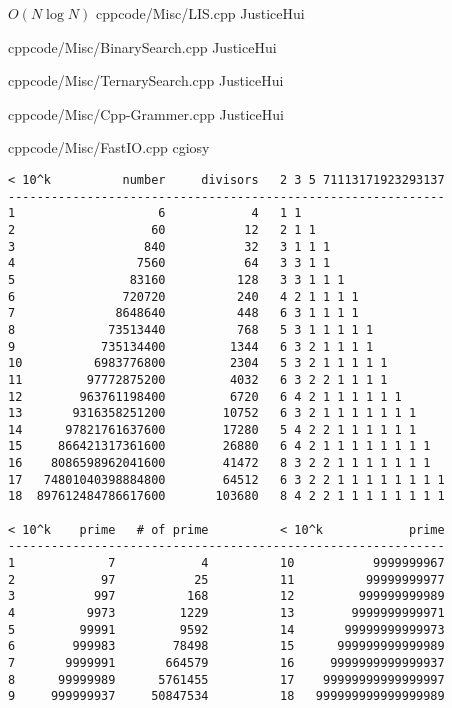\documentclass[landscape, 8pt, a4paper, twocolumn]{extarticle} %
\begin{document}
{}{$O(N \log N)$}
{cpp}{code/Misc/LIS.cpp}
{JusticeHui}

{}{}
{cpp}{code/Misc/BinarySearch.cpp}
{JusticeHui}

{}{}
{cpp}{code/Misc/TernarySearch.cpp}
{JusticeHui}

{}{}
{cpp}{code/Misc/Cpp-Grammer.cpp}
{JusticeHui}

{}{}
{cpp}{code/Misc/FastIO.cpp}
{cgiosy}

\begin{verbatim}
< 10^k          number     divisors   2 3 5 71113171923293137
-------------------------------------------------------------
1                    6            4   1 1
2                   60           12   2 1 1
3                  840           32   3 1 1 1
4                 7560           64   3 3 1 1
5                83160          128   3 3 1 1 1
6               720720          240   4 2 1 1 1 1
7              8648640          448   6 3 1 1 1 1
8             73513440          768   5 3 1 1 1 1 1
9            735134400         1344   6 3 2 1 1 1 1
10          6983776800         2304   5 3 2 1 1 1 1 1
11         97772875200         4032   6 3 2 2 1 1 1 1
12        963761198400         6720   6 4 2 1 1 1 1 1 1
13       9316358251200        10752   6 3 2 1 1 1 1 1 1 1
14      97821761637600        17280   5 4 2 2 1 1 1 1 1 1
15     866421317361600        26880   6 4 2 1 1 1 1 1 1 1 1
16    8086598962041600        41472   8 3 2 2 1 1 1 1 1 1 1
17   74801040398884800        64512   6 3 2 2 1 1 1 1 1 1 1 1
18  897612484786617600       103680   8 4 2 2 1 1 1 1 1 1 1 1

< 10^k    prime   # of prime          < 10^k            prime
-------------------------------------------------------------
1             7            4          10           9999999967
2            97           25          11          99999999977
3           997          168          12         999999999989
4          9973         1229          13        9999999999971
5         99991         9592          14       99999999999973
6        999983        78498          15      999999999999989
7       9999991       664579          16     9999999999999937
8      99999989      5761455          17    99999999999999997
9     999999937     50847534          18   999999999999999989
\end{verbatim}
\end{document}
